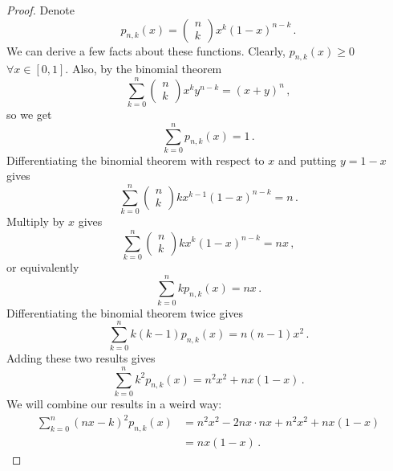 \documentclass{article}
\theoremstyle{plain}\theoremheaderfont{\normalfont\itshape}\theorembodyfont{\rmfamily}\theoremseparator{.}\newtheorem*{rem}{Remark}\newtheorem*{ex}{Example}\newtheorem*{proof}{Proof}\newtheorem*{altp}{Alternative proof}
\theoremstyle{plain}\theoremheaderfont{\normalfont\bfseries}\theorembodyfont{\rmfamily}\theoremseparator{.}\newtheorem{thm}{Theorem}[section]\newtheorem{lem}[thm]{Lemma}\newtheorem{prop}[thm]{Proposition}\newtheorem*{cor}{Corollary}\newtheorem{defn}[thm]{Definition}\newtheorem{clm}[thm]{Claim}\newtheorem{clminproof}{Claim}
\theoremstyle{break}\theoremheaderfont{\normalfont\itshape}\theorembodyfont{\rmfamily}\theoremseparator{.\medskip}\newtheorem*{proofskip}{Proof}\newtheorem*{exs}{Examples}\newtheorem*{rems}{Remarks}
\theoremstyle{break}\theoremheaderfont{\normalfont\bfseries}\theorembodyfont{\rmfamily}\theoremseparator{.\medskip}\newtheorem{lemskip}[thm]{Lemma}\newtheorem{defnskip}[thm]{Definition}\newtheorem{propskip}[thm]{Proposition}\newtheorem{thmskip}[thm]{Theorem}
\begin{document}
    \begin{proof}
        Denote
        \[p_{n,k}(x)=\begin{pmatrix}
            n\\k
        \end{pmatrix} x^k(1-x)^{n-k}\,.\]
        We can derive a few facts about these functions. Clearly, \(p_{n,k}(x)\ge 0\) \(\forall x\in[0,1]\). Also, by the binomial theorem
        \[\sum_{k=0}^{n}\begin{pmatrix}
            n \\ k
        \end{pmatrix}x^k y^{n-k}=(x+y)^n\,,\]
        so we get
        \[\sum_{k=0}^{n}p_{n,k}(x)=1\,.\]
        Differentiating the binomial theorem with respect to \(x\) and putting \(y=1-x\) gives
        \[\sum_{k=0}^{n}\begin{pmatrix}
            n \\ k
        \end{pmatrix}kx^{k-1}(1-x)^{n-k}=n\,.\]
        Multiply by \(x\) gives
        \[\sum_{k=0}^{n}\begin{pmatrix}
            n \\ k
        \end{pmatrix}kx^k(1-x)^{n-k}=nx\,,\]
        or equivalently
        \[\sum_{k=0}^{n}kp_{n,k}(x)=nx\,.\]
        Differentiating the binomial theorem twice gives
        \[\sum_{k=0}^{n}k(k-1)p_{n,k}(x)=n(n-1)x^2\,.\]
        Adding these two results gives
        \[\sum_{k=0}^{n}k^2 p_{n,k}(x)=n^2x^2+nx(1-x)\,.\]
        We will combine our results in a weird way:
        \begin{align*}
            \sum_{k=0}^{n}(nx-k)^2 p_{n,k}(x)&=n^2x^2-2nx\cdot nx+n^2x^2+nx(1-x)\\
            &=nx(1-x)\,.
        \end{align*}


\end{proof}
\end{document}
